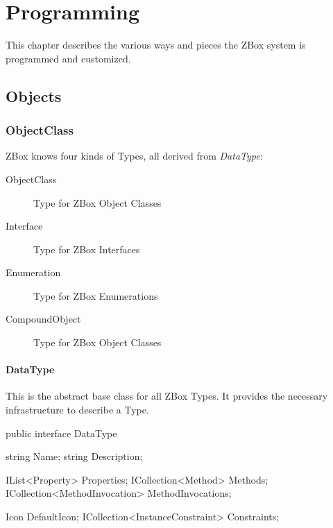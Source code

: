 \chapter{Programming}

This chapter describes the various ways and pieces the ZBox system is
programmed and customized.

\section{Objects}

\subsection{ObjectClass}

ZBox knows four kinds of Types, all derived from \emph{DataType}:
\begin{description}
\item[ObjectClass] { Type for ZBox Object Classes }
\item[Interface] { Type for ZBox Interfaces }
\item[Enumeration] { Type for ZBox Enumerations }
\item[CompoundObject] { Type for ZBox Object Classes }
\end{description}

\subsubsection{DataType}
This is the abstract base class for all ZBox Types. It provides the necessary
infrastructure to describe a Type.

\begin{CS}
public interface DataType 
{
    string Name;
    string Description;

    IList<Property> Properties;
    ICollection<Method> Methods;
    ICollection<MethodInvocation> MethodInvocations;

    Icon DefaultIcon;
    ICollection<InstanceConstraint> Constraints;
}
\end{CS}

